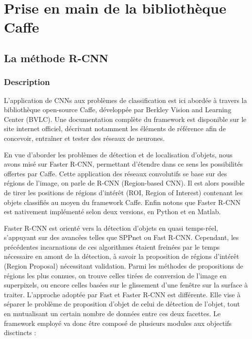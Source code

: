 \chapter{Prise en main de la bibliothèque Caffe}

  \section{La méthode R-CNN}

    \subsection{Description}
    
      L'application de CNNs aux problèmes de classification est ici abordée à travers la bibliothèque open-source Caffe, développée
      par Berkley Vision and Learning Center (BVLC)\cite{Bib_CaffeHome}. Une documentation complète du framework est disponible sur le site internet 
      officiel\cite{Bib_CaffeTuto}, décrivant notamment les éléments de référence afin de concevoir, entraîner et tester des réseaux de neurones. 
      
      En vue d'aborder les problèmes de détection et de localisation d'objets, nous avons misé sur Faster R-CNN\cite{Bib_FasterRCNN}, permettant d'étendre dans ce sens les possibilités offertes par Caffe.
      Cette application des réseaux convolutifs se base sur des régions de l'image, on parle de R-CNN (Region-based CNN).
      Il est alors possible de tirer les positions de régions d'intérêt (ROI, Region of Interest) contenant les objets classifiés au moyen du framework Caffe. 
      Enfin notons que Faster R-CNN est nativement implémenté selon deux versions, en Python et en Matlab. 
      
      Faster R-CNN est orienté vers la détection d'objets en quasi temps-réel, s'appuyant sur des avancées telles que SPPnet ou Fast R-CNN. 
      Cependant, les précédentes incarnations de ces algorithmes étaient freinées par le temps nécessaire en amont de la détection, à savoir la proposition de régions d'intérêt (Region Proposal) nécessitant validation. 
      Parmi les méthodes de propositions de régions les plus connues, on trouve celles tirées de conversion de l'image en superpixels, ou encore celles basées sur le glissement d'une fenêtre sur la surface à traiter. L'approche adoptée par Fast et Faster R-CNN est différente. 
      Elle vise à séparer le problème de proposition d'objet de celui de détection de l'objet, tout en mutualisant un certain nombre de données entre ces deux facettes. 
      Le framework employé va donc être composé de plusieurs modules aux objectifs disctincts : 
      
